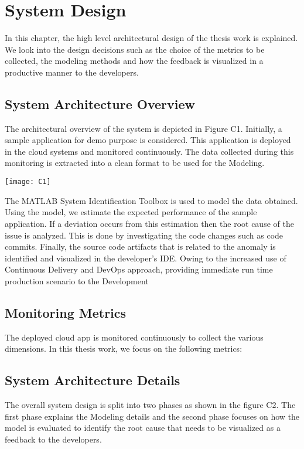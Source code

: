 \documentclass[article,type=msc,colorback,12pt,accentcolor=tud7b]{tudthesis}
\begin{document}
 \cleardoublepage
 \section{System Design}	
 
	In this chapter, the high level architectural design of the thesis work is explained. We look into the design decisions such as the choice of the metrics to be collected, the modeling methods and how the feedback is visualized in a productive manner to the developers.
 
\subsection{System Architecture Overview} 

	The architectural overview of the system is depicted in Figure C1. Initially,  a sample application for demo purpose is considered. This application is deployed in the cloud systems and monitored continuously. The data collected during this monitoring is extracted into a clean format to be used for the Modeling.
	
	\texttt{[image: C1]} 
	
The MATLAB System Identification Toolbox is used to model the data obtained. Using the model, we estimate the expected performance of the sample application. If a deviation occurs from this estimation then the root cause of the issue is analyzed. This is done by investigating the code changes such as code commits. Finally, the source code artifacts that is related to the anomaly is identified and visualized in the developer's IDE. Owing to the increased use of Continuous Delivery and DevOps approach, providing immediate run time production scenario to the Development 

\subsection{Monitoring Metrics} 

The deployed cloud app is monitored continuously to collect the various dimensions. In this thesis work, we focus on the following metrics:

 
 \subsection{System Architecture Details}
 	The overall system design is split into two phases as shown in the figure C2. The first phase explains the Modeling details and the second phase focuses on how the model is evaluated to identify the root cause that needs to be visualized as a feedback to the developers.
 	
\end{document}
